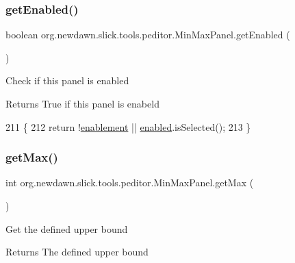 \subsubsection{\texorpdfstring{get\+Enabled()}{getEnabled()}}
{\footnotesize\ttfamily boolean org.\+newdawn.\+slick.\+tools.\+peditor.\+Min\+Max\+Panel.\+get\+Enabled (\begin{DoxyParamCaption}{ }\end{DoxyParamCaption})\hspace{0.3cm}{\ttfamily [inline]}}

Check if this panel is enabled

\begin{DoxyReturn}{Returns}
True if this panel is enabeld 
\end{DoxyReturn}

\begin{DoxyCode}
211                                 \{
212         \textcolor{keywordflow}{return} !\mbox{\hyperlink{classorg_1_1newdawn_1_1slick_1_1tools_1_1peditor_1_1_min_max_panel_a82cdf912c2f081581d288b771c431703}{enablement}} || \mbox{\hyperlink{classorg_1_1newdawn_1_1slick_1_1tools_1_1peditor_1_1_min_max_panel_aff685339c4d9c4cf8009bcfbf2bc72de}{enabled}}.isSelected();
213     \}
\end{DoxyCode}
\mbox{\label{classorg_1_1newdawn_1_1slick_1_1tools_1_1peditor_1_1_min_max_panel_ad7a04168e42375f9bb72fd34712858cc}} 
\subsubsection{\texorpdfstring{get\+Max()}{getMax()}}
{\footnotesize\ttfamily int org.\+newdawn.\+slick.\+tools.\+peditor.\+Min\+Max\+Panel.\+get\+Max (\begin{DoxyParamCaption}{ }\end{DoxyParamCaption})\hspace{0.3cm}{\ttfamily [inline]}}

Get the defined upper bound

\begin{DoxyReturn}{Returns}
The defined upper bound 
\end{DoxyReturn}

